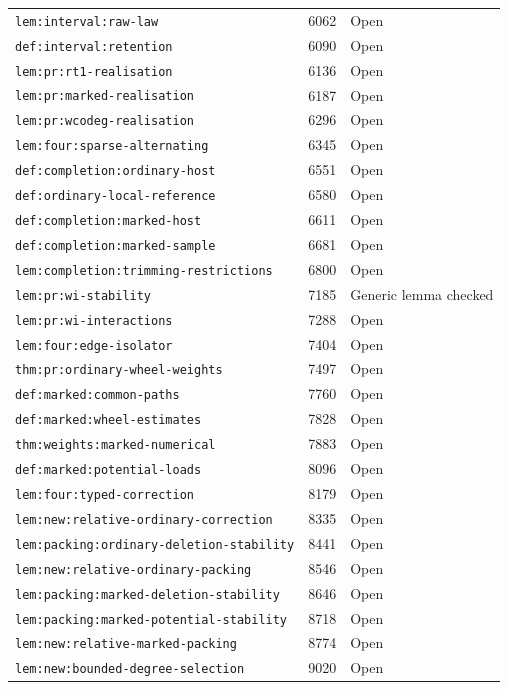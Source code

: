 \begin{tabular}{lll}
\nolinkurl{lem:interval:raw-law} & 6062 & Open \\
\nolinkurl{def:interval:retention} & 6090 & Open \\
\nolinkurl{lem:pr:rt1-realisation} & 6136 & Open \\
\nolinkurl{lem:pr:marked-realisation} & 6187 & Open \\
\nolinkurl{lem:pr:wcodeg-realisation} & 6296 & Open \\
\nolinkurl{lem:four:sparse-alternating} & 6345 & Open \\
\nolinkurl{def:completion:ordinary-host} & 6551 & Open \\
\nolinkurl{def:ordinary-local-reference} & 6580 & Open \\
\nolinkurl{def:completion:marked-host} & 6611 & Open \\
\nolinkurl{def:completion:marked-sample} & 6681 & Open \\
\nolinkurl{lem:completion:trimming-restrictions} & 6800 & Open \\
\nolinkurl{lem:pr:wi-stability} & 7185 & Generic lemma checked \\
\nolinkurl{lem:pr:wi-interactions} & 7288 & Open \\
\nolinkurl{lem:four:edge-isolator} & 7404 & Open \\
\nolinkurl{thm:pr:ordinary-wheel-weights} & 7497 & Open \\
\nolinkurl{def:marked:common-paths} & 7760 & Open \\
\nolinkurl{def:marked:wheel-estimates} & 7828 & Open \\
\nolinkurl{thm:weights:marked-numerical} & 7883 & Open \\
\nolinkurl{def:marked:potential-loads} & 8096 & Open \\
\nolinkurl{lem:four:typed-correction} & 8179 & Open \\
\nolinkurl{lem:new:relative-ordinary-correction} & 8335 & Open \\
\nolinkurl{lem:packing:ordinary-deletion-stability} & 8441 & Open \\
\nolinkurl{lem:new:relative-ordinary-packing} & 8546 & Open \\
\nolinkurl{lem:packing:marked-deletion-stability} & 8646 & Open \\
\nolinkurl{lem:packing:marked-potential-stability} & 8718 & Open \\
\nolinkurl{lem:new:relative-marked-packing} & 8774 & Open \\
\nolinkurl{lem:new:bounded-degree-selection} & 9020 & Open \\

\end{tabular}
